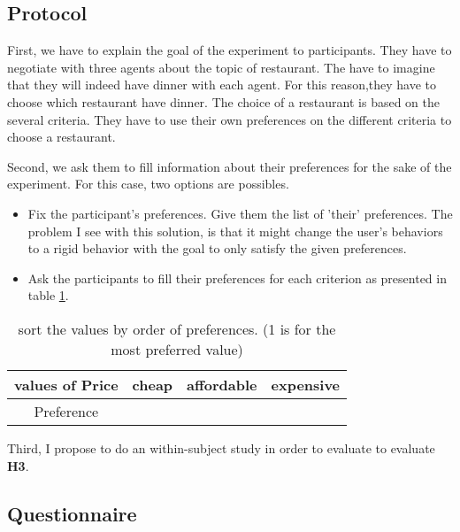 \documentclass {article}
\begin{document}
	\subsection{Protocol}
		First, we have to explain the goal of the experiment to participants.
		They have to negotiate with three agents about the topic of restaurant. The have to imagine that they will indeed have dinner with each agent. For this reason,they have to choose which restaurant have dinner.
		The choice of a restaurant is based on the several criteria. They have to use their own preferences on the different criteria to choose a restaurant. 
		
		Second, we ask them to fill information about their preferences for the sake of the experiment.
		For this case, two options are possibles. 
		\begin{itemize}
				\item  Fix the participant's preferences. Give them the list of 'their' preferences. The problem I see with this solution, is that it might change the user's behaviors to a rigid behavior with the goal to only satisfy the given preferences. 
				\item Ask the participants to fill their preferences for each criterion as presented in table \ref{tab:ex_pref}.
		\end{itemize}
		
		\begin{table}[h]
			\centering
			\label{tab:ex_pref}
			\caption{sort the values by order of preferences. (1 is for the most preferred value)}
			\begin{tabular} {|c|c|c|c|}
				\hline
				 values of Price& cheap & affordable & expensive \\
				\hline
				Preference &  &  &    \\
				\hline
			\end{tabular}
		\end{table}
		
		Third, I propose to do an within-subject study in order to evaluate to evaluate \textbf{H3}. 
	
	\subsection{Questionnaire}
		
\end{document}

